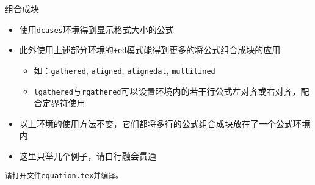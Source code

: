 \begin{frame}{组合成块}
	\begin{itemize}
		\item 使用\texttt{dcases}环境得到显示格式大小的公式
		\item 此外使用上述部分环境的\texttt{+ed}模式能得到更多的将公式组合成块的应用
		\begin{itemize}
	 		\item 如：\texttt{gathered}, \texttt{aligned}, \texttt{alignedat}, \texttt{multilined}
	 		\item \texttt{lgathered}与\texttt{rgathered}可以设置环境内的若干行公式左对齐或右对齐，配合定界符使用
	 	\end{itemize}
	 	\item 以上环境的使用方法不变，它们都将多行的公式组合成块放在了一个公式环境内
	 	\item 这里只举几个例子，请自行融会贯通
	\end{itemize}
	\centering
	\texttt{请打开文件equation.tex并编译。}
\end{frame}